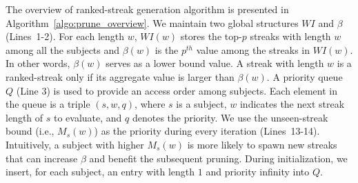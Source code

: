 The overview of ranked-streak generation algorithm is presented in Algorithm~\ref{algo:prune_overview}. We maintain two global structures $WI$ and $\beta$ (Lines~1-2). For each length $w$, $WI(w)$ stores the top-$p$ streaks with length $w$ among all the subjects and $\beta(w)$ is the $p^{th}$ value among the streaks in $WI(w)$.  
In other words, $\beta(w)$ serves as a lower bound value. A streak with length $w$ is a ranked-streak only if its aggregate value is larger than $\beta(w)$. A priority queue $Q$ (Line 3) is used to provide an access order among subjects. Each element in the queue is a triple $(s,w,q)$, where $s$ is a subject, $w$ indicates the next streak length of $s$ to evaluate, and $q$ denotes the priority. We use the unseen-streak bound (i.e., $M_s(w)$) as the priority during every iteration (Lines~13-14). Intuitively, a subject with higher $M_s(w)$ is more likely to spawn new streaks that can increase $\beta$ and benefit the subsequent pruning. During initialization, we insert, for each subject, an entry with length $1$ and priority infinity into $Q$.




